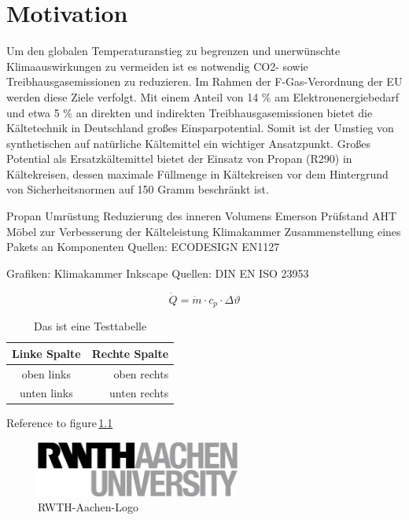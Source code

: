 \chapter{Motivation}
\label{cha:Motivation}

Um den globalen Temperaturanstieg zu begrenzen und unerwünschte Klimaauswirkungen zu vermeiden ist es notwendig CO2- sowie Treibhausgasemissionen zu reduzieren. Im Rahmen der F-Gas-Verordnung der EU werden diese Ziele verfolgt. Mit einem Anteil von 14 \%  am Elektronenergiebedarf und etwa 5 \% an direkten und indirekten Treibhausgasemissionen bietet die Kältetechnik in Deutschland großes Einsparpotential. Somit ist der Umstieg von synthetischen auf natürliche Kältemittel ein wichtiger Ansatzpunkt. 
Großes Potential als Ersatzkältemittel bietet der Einsatz von Propan (R290) in Kältekreisen, dessen maximale Füllmenge in Kältekreisen vor dem Hintergrund von Sicherheitsnormen auf 150 Gramm beschränkt ist. 

Propan Umrüstung
Reduzierung des inneren Volumens
Emerson Prüfstand AHT Möbel zur Verbesserung der Kälteleistung
Klimakammer
Zusammenstellung eines Pakets an Komponenten
Quellen:
ECODESIGN
EN1127



Grafiken:
Klimakammer Inkscape
Quellen:
DIN EN ISO 23953



\begin{equation}
\dot{Q}=\dot{m}\cdot c_p \cdot \Delta \vartheta
\end{equation}



\begin{table} %
	\centering
	\caption{Das ist eine Testtabelle}\vspace{6pt}
	\label{tab:Table}
\begin{tabular}{cr} 
\toprule
\textbf{Linke Spalte} & \textbf{Rechte Spalte}\\
\midrule 
oben links & oben rechts \\ \midrule 
unten links & unten rechts \\ 
\bottomrule 
\end{tabular}
\end{table}


Reference to figure\,\ref{fig:RWTH-Aachen-Logo}
\begin{figure} %
\centering
\includegraphics[width=0.60\textwidth]{Pictures/RWTHAACHENUNIVERSITY_sw.png}
\caption{RWTH-Aachen-Logo}
\label{fig:RWTH-Aachen-Logo}
\end{figure}

